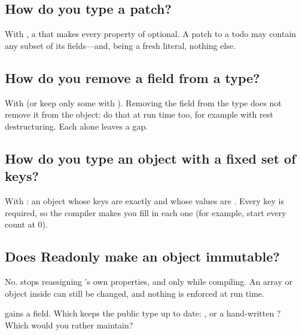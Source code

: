 \label{ch:c23}

\subsection{How do you type a patch?}%
With , a  that makes every property of  optional. A patch to a todo may contain any subset of its fields---and, being a fresh literal, nothing else.

\subsection{How do you remove a field from a type?}%
With  (or keep only some with ). Removing the field from the type does not remove it from the object: do that at run time too, for example with rest destructuring. Each alone leaves a gap.

\subsection{How do you type an object with a fixed set of keys?}%
With : an object whose keys are exactly  and whose values are . Every key is required, so the compiler makes you fill in each one (for example, start every count at 0).

\subsection{Does Readonly make an object immutable?}%
No.  stops reassigning 's own properties, and only while compiling. An array or object inside can still be changed, and nothing is enforced at run time.

\begin{ponder} gains a  field. Which keeps the public type up to date: , or a hand-written ? Which would you rather maintain?\end{ponder}
